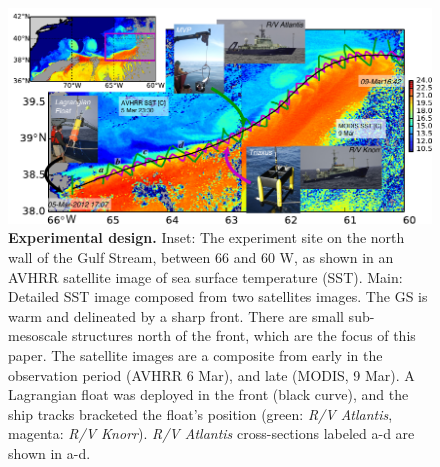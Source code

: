 \documentclass{natureJMK}
\begin{document}
\begin{figure}[htbp]
  \centering
    \includegraphics[width=\textwidth]{./SatOverviewSecDTry2.pdf}
   \caption{{\bf Experimental design.}  Inset: The experiment site on the north wall of the Gulf Stream, between 66 and 60 W, as shown in an AVHRR satellite image of sea surface temperature (SST).  Main:  Detailed SST image composed from two satellites images.    The GS is warm and delineated by a sharp front.  There are small sub-mesoscale structures north of the front, which are the focus of this paper.  The satellite images are a composite from early in the observation period (AVHRR 6 Mar), and late (MODIS, 9 Mar).  A Lagrangian float was deployed in the front (black curve), and the ship tracks bracketed the float's position (green: \emph{R/V Atlantis}, magenta: \emph{R/V Knorr}). \emph{R/V Atlantis} cross-sections labeled a-d are shown in a-d.  }\label{fig:SatOverviewSectD}
\end{figure}
\end{document}

